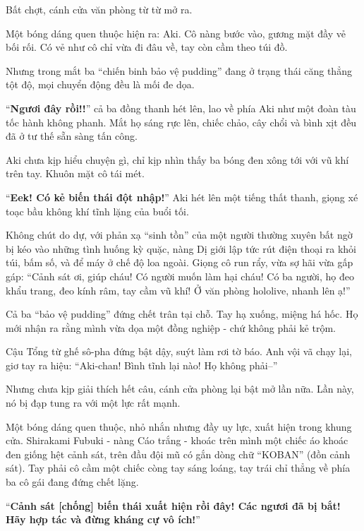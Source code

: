 \documentclass[../main.tex]{subfiles}
\begin{document}
Bất chợt, cánh cửa văn phòng từ từ mở ra.

Một bóng dáng quen thuộc hiện ra: Aki. Cô nàng bước vào, gương mặt đầy vẻ bối rối. Có vẻ như cô chỉ vừa đi đâu về, tay còn cầm theo túi đồ.


Nhưng trong mắt ba ``chiến binh bảo vệ pudding'' đang ở trạng thái căng thẳng tột độ, mọi chuyển động đều là mối đe dọa.

``\textbf{Ngươi đây rồi!!}'' cả ba đồng thanh hét lên, lao về phía Aki như một đoàn tàu tốc hành không phanh. Mắt họ sáng rực lên, chiếc chảo, cây chổi và bình xịt đều đã ở tư thế sẵn sàng tấn công.

Aki chưa kịp hiểu chuyện gì, chỉ kịp nhìn thấy ba bóng đen xông tới với vũ khí trên tay. Khuôn mặt cô tái mét.

``\textbf{Eek! Có kẻ biến thái đột nhập!}'' Aki hét lên một tiếng thất thanh, giọng xé toạc bầu không khí tĩnh lặng của buổi tối.

Không chút do dự, với phản xạ ``sinh tồn'' của một người thường xuyên bất ngờ bị kéo vào những tình huống kỳ quặc, nàng Dị giới lập tức rút điện thoại ra khỏi túi, bấm số, và để máy ở chế độ loa ngoài. Giọng cô run rẩy, vừa sợ hãi vừa gấp gáp: ``Cảnh sát ơi, giúp cháu! Có người muốn làm hại cháu! Có ba người, họ đeo khẩu trang, đeo kính râm, tay cầm vũ khí! Ở văn phòng hololive, nhanh lên ạ!''


Cả ba ``bảo vệ pudding'' đứng chết trân tại chỗ. Tay hạ xuống, miệng há hốc. Họ mới nhận ra rằng mình vừa dọa một đồng nghiệp - chứ không phải kẻ trộm.

Cậu Tổng từ ghế sô-pha đứng bật dậy, suýt làm rơi tờ báo. Anh vội vã chạy lại, giơ tay ra hiệu: ``Aki-chan! Bình tĩnh lại nào! Họ không phải--''

Nhưng chưa kịp giải thích hết câu, cánh cửa phòng lại bật mở lần nữa. Lần này, nó bị đạp tung ra với một lực rất mạnh.

Một bóng dáng quen thuộc, nhỏ nhắn nhưng đầy uy lực, xuất hiện trong khung cửa. Shirakami Fubuki - nàng Cáo trắng - khoác trên mình một chiếc áo khoác đen giống hệt cảnh sát, trên đầu đội mũ có gắn dòng chữ ``KOBAN'' (đồn cảnh sát). Tay phải cô cầm một chiếc còng tay sáng loáng, tay trái chỉ thẳng về phía ba cô gái đang đứng chết lặng.

``\textbf{Cảnh sát [chống] biến thái xuất hiện rồi đây! Các ngươi đã bị bắt! Hãy hợp tác và đừng kháng cự vô ích!}''
\end{document}
